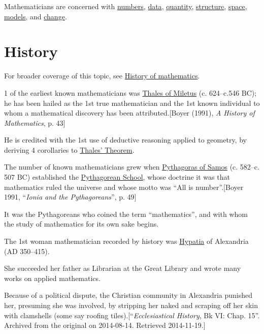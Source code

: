 \documentclass{book}
\numberwithin{equation}{section}
\begin{document}
Mathematicians are concerned with \href{https://en.wikipedia.org/wiki/Number}{numbers}, \href{https://en.wikipedia.org/wiki/Data}{data}, \href{https://en.wikipedia.org/wiki/Quantity}{quantity}, \href{https://en.wikipedia.org/wiki/Mathematical_structure}{structure}, \href{https://en.wikipedia.org/wiki/Space}{space}, \href{https://en.wikipedia.org/wiki/Mathematical_model}{models}, and \href{https://en.wikipedia.org/wiki/Mathematics#Change}{change}.

\section{History}
For broader coverage of this topic, see \href{https://en.wikipedia.org/wiki/History_of_mathematics}{History of mathematics}.

%
1 of the earliest known mathematicians was \href{https://en.wikipedia.org/wiki/Thales_of_Miletus}{Thales of Miletus} (c. 624--c.546 BC); he has been hailed as the 1st true mathematician and the 1st known individual to whom a mathematical discovery has been attributed.[Boyer (1991), \textit{A History of Mathematics}, p. 43]

He is credited with the 1st use of deductive reasoning applied to geometry, by deriving 4 corollaries to \href{https://en.wikipedia.org/wiki/Thales%27_Theorem}{Thales' Theorem}.
    
%
The number of known mathematicians grew when \href{https://en.wikipedia.org/wiki/Pythagoras_of_Samos}{Pythagoras of Samos} (c. 582--c. 507 BC) established the \href{https://en.wikipedia.org/wiki/Pythagoreans}{Pythagorean School}, whose doctrine it was that mathematics ruled the universe and whose motto was ``All is number''.[Boyer 1991, ``\textit{Ionia and the Pythagoreans}'', p. 49]

It was the Pythagoreans who coined the term ``mathematics'', and with whom the study of mathematics for its own sake begins.

%
The 1st woman mathematician recorded by history was \href{https://en.wikipedia.org/wiki/Hypatia}{Hypatia} of Alexandria (AD 350--415).

She succeeded her father as Librarian at the Great Library and wrote many works on applied mathematics.

Because of a political dispute, the Christian community in Alexandria punished her, presuming she was involved, by stripping her naked and scraping off her skin with clamshells (some say roofing tiles).[``\textit{Ecclesiastical History}, Bk VI: Chap. 15''. Archived from the original on 2014-08-14. Retrieved 2014-11-19.]
\end{document}
